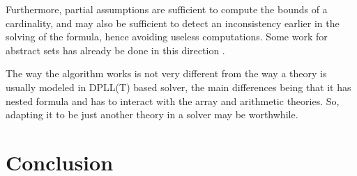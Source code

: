 \documentclass[]{article}
\begin{document}
{Furthermore, partial assumptions are sufficient to compute the bounds of
a cardinality, and may also be sufficient to detect an inconsistency
earlier in the solving of the formula, hence avoiding useless
computations. Some work for abstract sets has already be done in this
direction \cite{cardinalityset}.

The way the algorithm works is not very different from the way a theory
is usually modeled in DPLL(T) based solver, the main differences being
that it has nested formula and has to interact with the array and
arithmetic theories. So, adapting it to be just another theory in a
solver may be worthwhile.

\newpage

\section*{Conclusion}


}{}

\newpage


\end{document}
